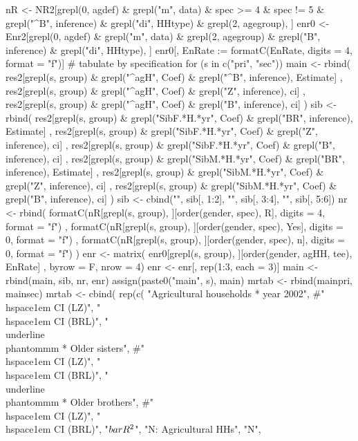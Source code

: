 \begin{Schunk}
\begin{Sinput}
nR <- NR2[grepl(0, agdef) & grepl("m", data) & spec >= 4 & spec != 5  
& grepl("^B", inference) & grepl("di", HHtype) & grepl(2, agegroup), ]
enr0 <- Enr2[grepl(0, agdef) & grepl("m", data) & grepl(2, agegroup)
& grepl("B", inference) & grepl("di", HHtype), ]
enr0[, EnRate := formatC(EnRate, digits = 4, format = "f")]
# tabulate by specification
for (s in c("pri", "sec")) {
  main <- rbind(
    res2[grepl(s, group) & grepl("^agH", Coef) & grepl("^B", inference), Estimate]
    ,
    res2[grepl(s, group) & grepl("^agH", Coef) & grepl("Z", inference), ci]
    ,
    res2[grepl(s, group) & grepl("^agH", Coef) & grepl("B", inference), ci]
  )
  sib <-  rbind(
     res2[grepl(s, group) & grepl("SibF.*H.*yr", Coef) & grepl("BR", inference), Estimate]
     , 
     res2[grepl(s, group) & grepl("SibF.*H.*yr", Coef) & grepl("Z", inference), ci]
     ,
     res2[grepl(s, group) & grepl("SibF.*H.*yr", Coef) & grepl("B", inference), ci]
     ,
     res2[grepl(s, group) & grepl("SibM.*H.*yr", Coef) & grepl("BR", inference), Estimate]
     , 
     res2[grepl(s, group) & grepl("SibM.*H.*yr", Coef) & grepl("Z", inference), ci]
     ,
     res2[grepl(s, group) & grepl("SibM.*H.*yr", Coef) & grepl("B", inference), ci]
   )
  sib <- cbind("", sib[, 1:2], "", sib[, 3:4], "", sib[, 5:6])
  nr <- rbind(
    formatC(nR[grepl(s, group), ][order(gender, spec), R], digits = 4, format = "f")
  , formatC(nR[grepl(s, group), ][order(gender, spec), Yes], digits = 0, format = "f")
  , formatC(nR[grepl(s, group), ][order(gender, spec), n], digits = 0, format = "f")
  )
  enr <- matrix(
   enr0[grepl(s, group), ][order(gender, agHH, tee), EnRate]
   , byrow = F, nrow = 4)
  enr <- enr[, rep(1:3, each = 3)]
  main <- rbind(main, sib, nr, enr)
  assign(paste0("main", s), main)
}
mrtab <- rbind(mainpri, mainsec)
mrtab <- 
cbind(
    rep(c(
      "Agricultural households * year 2002", 
      #"\\hspace{1em} CI (LZ)", 
      "\\hspace{1em} CI (BRL)", 
      "\\underline{\\phantom{mm}} * Older sisters",
      #"\\hspace{1em} CI (LZ)", 
      "\\hspace{1em} CI (BRL)", 
      "\\underline{\\phantom{mm}} * Older brothers",
      #"\\hspace{1em} CI (LZ)", 
      "\\hspace{1em} CI (BRL)", 
      "$\\bar{R}^{2}$", "N: Agricultural HHs", "N",

\end{Sinput}
\end{Schunk}
